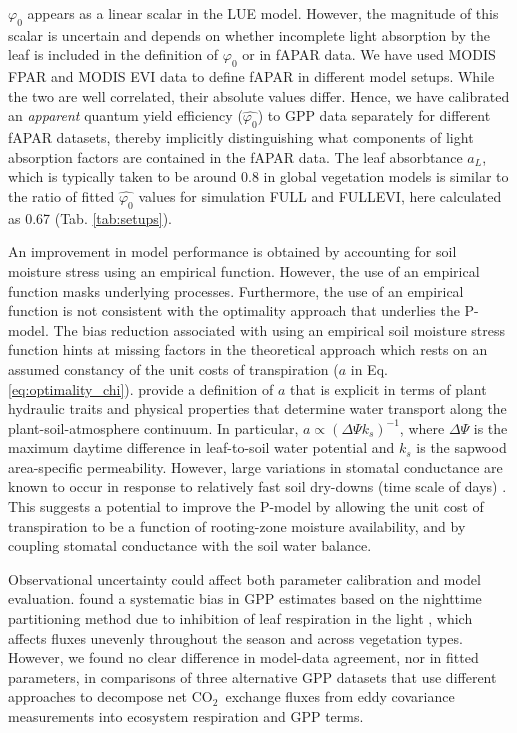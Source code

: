 \documentclass[gmd, manuscript]{copernicus}
\newcommand{\coo}{CO$_2$}
\begin{document}
$\varphi_0$ appears as a linear scalar in the LUE model. However, the magnitude of this scalar is uncertain and depends on whether incomplete light absorption by the leaf is included in the definition of $\varphi_0$ or in fAPAR data. We have used MODIS FPAR and MODIS EVI data to define fAPAR in different model setups.  While the two are well correlated, their absolute values differ. Hence, we have calibrated an \textit{apparent} quantum yield efficiency ($\widehat{\varphi_0}$) to GPP data separately for different fAPAR datasets, thereby implicitly distinguishing what components of light absorption factors are contained in the fAPAR data. The leaf absorbtance $a_L$, which is typically taken to be around 0.8 in global vegetation models \citep{rogers17} is similar to the ratio of fitted $\widehat{\varphi_0}$ values for simulation FULL and FULL\textunderscore EVI, here calculated as 0.67 (Tab. \ref{tab:setups}).

An improvement in model performance is obtained by accounting for soil moisture stress using an empirical function.  However, the use of an empirical function masks underlying processes. Furthermore, the use of an empirical function is not consistent with the optimality approach that underlies the P-model. The bias reduction associated with using an empirical soil moisture stress function hints at missing factors in the theoretical approach which rests on an assumed constancy of the unit costs of transpiration ($a$ in Eq. \ref{eq:optimality_chi}). \citet{prentice14ecollett} provide a definition of $a$ that is explicit in terms of plant hydraulic traits and physical properties that determine water transport along the plant-soil-atmosphere continuum. In particular, $a \propto ( \Delta \Psi k_s )^{-1}$, where $\Delta \Psi$ is the maximum daytime difference in leaf-to-soil water potential and $k_s$ is the sapwood area-specific permeability. However, large variations in stomatal conductance are known to occur in response to relatively fast soil dry-downs (time scale of days) \citep{keenan10agrformet, egea11, stocker18newphyt}. This suggests a potential to improve the P-model by allowing the unit cost of transpiration to be a function of rooting-zone moisture availability, and by coupling stomatal conductance with the soil water balance.

Observational uncertainty could affect both parameter calibration and model evaluation. \citet{keenan19natee} found a systematic bias in GPP estimates based on the nighttime partitioning method due to inhibition of leaf respiration in the light \citep{kok49, wehr16}, which affects fluxes unevenly throughout the season and across vegetation types. However, we found no clear difference in model-data agreement, nor in fitted parameters,  in comparisons of three alternative GPP datasets that use different approaches to decompose net \coo\ exchange fluxes from eddy covariance measurements into ecosystem respiration and GPP terms.
\end{document}
